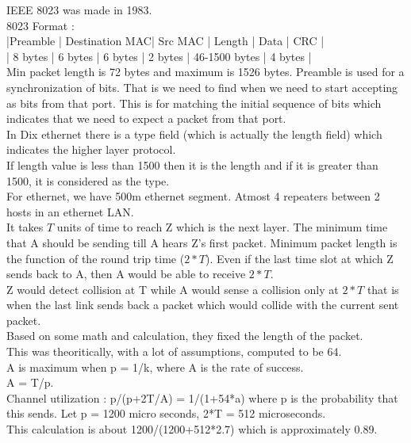 \documentclass[solution,addpoints,12pt]{exam}
\begin{document}
IEEE 8023 was made in 1983.\\
8023 Format :\\
|Preamble | Destination MAC| Src MAC | Length  | Data          | CRC     |\\
| 8 bytes |    6 bytes     | 6 bytes | 2 bytes | 46-1500 bytes | 4 bytes |\\
Min packet length is 72 bytes and maximum is 1526 bytes.
Preamble is used for a synchronization of bits. That is we need to find
when we need to start accepting as bits from that port. This is for
matching the initial sequence of bits which indicates that
we need to expect a packet from that port.\\

In Dix ethernet there is a type field (which is actually the length field)
which indicates the higher layer protocol.\\
If length value is less than 1500 then it is the length and if it is greater
than 1500, it is considered as the type.\\

For ethernet, we have 500m ethernet segment. Atmost
4 repeaters between 2 hosts in an ethernet LAN.\\
It takes $T$ units of time to reach Z which is the next layer.
The minimum time that A should be sending till A hears Z's
first packet. Minimum packet length is the function
of the round trip time ($2*T$). Even if the last time slot
at which Z sends back to A, then A would be able to receive $2*T$.\\
Z would detect collision at T while A would sense a collision only
at $2*T$ that is when the last link sends back a packet which
would collide with the current sent packet.\\

Based on some math and calculation, they fixed the
length of the packet.\\
This was theoritically, with a lot of assumptions, computed to be
64.\\
A is maximum when p = 1/k, where A is the rate of success.\\
A = T/p.\\
Channel utilization : p/(p+2T/A) = 1/(1+54*a) where p is the probability that
this sends. Let p = 1200 micro seconds, 2*T = 512 microseconds.\\
This calculation is about 1200/(1200+512*2.7)
which is approximately 0.89.\\
\end{document}
